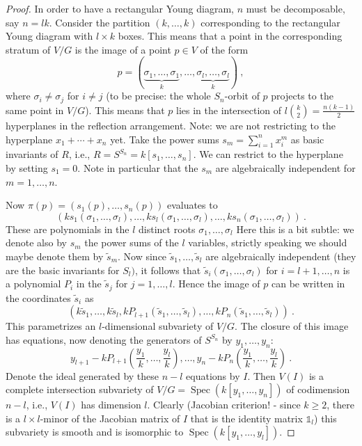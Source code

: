 \documentclass[letter,11pt]{amsart}
\DeclareMathOperator{\Spec}{Spec}
\newcommand{\ef}[1]{{\color{Cerulean} #1}}
\theoremstyle{theorem}
\theoremstyle{remark}
\theoremstyle{definition}
\begin{document}
\begin{proof} In order to have a rectangular Young diagram, $n$ must be decomposable, say $n=lk$.  Consider the partition $(k,\ldots, k)$ corresponding to the rectangular Young diagram with $l \times k$ boxes. This means that  a point in the corresponding stratum of $V/G$ is the image of a point $p \in V$ of the form 
$$p=(\underbrace{\sigma_1, \ldots, \sigma_1}_k, \ldots, \underbrace{\sigma_l, \ldots, \sigma_l}_k) \ ,$$
 where $\sigma_i \neq \sigma_j$ for $i \neq j$ (to be precise: the whole $S_n$-orbit of $p$ projects to the same point in $V/G$). This means that $p$ lies in the intersection of $l { k \choose 2}=\frac{n(k-1)}{2}$ hyperplanes in the reflection arrangement. \ef{Note: we are not restricting to the hyperplane $x_1 + \cdots + x_n$ yet.} Take the power sums $s_m=\sum_{i=1}^nx_i^m$ as basic invariants of $R$, i.e., $R=S^{S_n}=k[s_1, \ldots, s_n]$. We can restrict to the hyperplane by setting $s_1=0$. Note in particular that the $s_m$ are algebraically independent for $m=1, \ldots, n$. 

Now $\pi(p)=(s_1(p), \ldots, s_n(p))$ evaluates to 
$$(k s_1(\sigma_1, \ldots, \sigma_l), \ldots, k s_l(\sigma_1, \ldots, \sigma_l), \ldots, k s_n(\sigma_1, \ldots, \sigma_l)) \ . $$
These are polynomials in the $l$ distinct roots $\sigma_1, \ldots, \sigma_l$ \ef{Here this is a bit subtle: we denote also by $s_m$ the power sums of the $l$ variables, strictly speaking we should maybe denote them by $\tilde s_m$}. Now since $\tilde s_1, \ldots, \tilde s_l$ are algebraically independent (they are the basic invariants for $S_l)$, it follows that $\tilde s_i(\sigma_1, \ldots, \sigma_l)$ for $i=l+1, \ldots, n$ is a polynomial $P_i$ in the $\tilde s_j$ for $j=1, \ldots, l$. Hence the image of $p$ can be written in the coordinates $\tilde s_i$ as
$$(k \tilde s_1, \ldots, k \tilde s_l, k P_{l+1}(\tilde s_1, \ldots, \tilde s_l), \ldots, k P_n(\tilde s_1, \ldots, \tilde s_l)) \ .$$
This parametrizes an $l$-dimensional subvariety of $V/G$. The closure of this image has equations, now denoting the generators of $S^{S_n}$ by $y_1, \ldots, y_n$:
$$y_{l+1}-k P_{l+1}(\frac{y_1}{k}, \ldots, \frac{y_l}{k}), \ldots, y_n-kP_n(\frac{y_1}{k}, \ldots, \frac{y_l}{k}) \ .$$
Denote the ideal generated by these $n-l$ equations by $I$. Then $V(I)$ is a complete intersection subvariety of $V/G=\Spec(k[y_1, \ldots, y_n])$ of codimension $n-l$, i.e., $V(I)$ has dimension $l$.
Clearly (Jacobian criterion! - since $k \geq 2$, there is a $l \times l$-minor of the Jacobian matrix of $I$ that is the identity matrix $\mathbb{1}_{l}$) this subvariety is smooth and is isomorphic to $\Spec(k[y_1, \ldots, y_l])$.
\end{proof}
\end{document}
